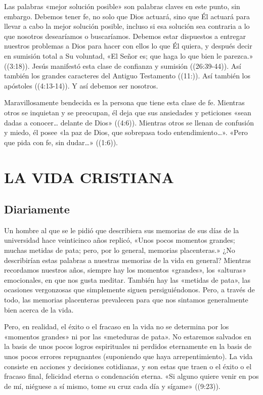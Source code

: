 \documentclass[12pt, twoside, openright]{book}
\begin{document}
Las palabras «mejor solución posible» son palabras claves en este punto, sin embargo. Debemos tener fe, no solo que Dios actuará, sino que Él actuará para llevar a cabo la mejor solución posible, incluso si esa solución sea contraria a lo que nosotros desearíamos o buscaríamos. Debemos estar dispuestos a entregar nuestros problemas a Dios para hacer con ellos lo que Él quiera, y después decir en sumisión total a Su voluntad, «El Señor es; que haga lo que bien le parezca.» ((3:18)). Jesús manifestó esta clase de confianza y sumisión ((26:39-44)). Así también los grandes caracteres del Antiguo Testamento ((11:)). Así también los apóstoles ((4:13-14)). Y así debemos ser nosotros.

Maravillosamente bendecida es la persona que tiene esta clase de fe. Mientras otros se inquietan y se preocupan, él deja que sus ansiedades y peticiones «sean dadas a conocer… delante de Dios» ((4:6)). Mientras otros se llenan de confusión y miedo, él posee «la paz de Dios, que sobrepasa todo entendimiento…». «Pero que pida con fe, sin dudar…» ((1:6)).

\chapter{LA VIDA CRISTIANA}

\section{Diariamente}
Un hombre al que se le pidió que describiera sus memorias de sus días de la universidad hace veinticinco años replicó, «Unos pocos momentos grandes; muchas metidas de pata; pero, por lo general, memorias placenteras.»
¿No describirían estas palabras a nuestras memorias de la vida en general? Mientras recordamos nuestros años, siempre hay los momentos «grandes», los «alturas» emocionales, en que nos gusta meditar. También hay las «metidas de pata», las ocasiones vergonzosas que simplemente siguen persiguiéndonos. Pero, a través de todo, las memorias placenteras prevalecen para que nos sintamos generalmente bien acerca de la vida. 

Pero, en realidad, el éxito o el fracaso en la vida no se determina por los «momentos grandes» ni por las «meteduras de pata». No estaremos salvados en la basis de unos pocos logros espirituales ni perdidos eternamente en la basis de unos pocos errores repugnantes (suponiendo que haya arrepentimiento). La vida consiste en acciones y decisiones cotidianas, y son estas que traen o el éxito o el fracaso final, felicidad eterna o condenación eterna. «Si alguno quiere venir en pos de mí, niéguese a sí mismo, tome su cruz cada día y sígame» ((9:23)).
\end{document}
